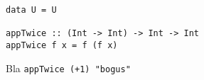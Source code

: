 \documentclass[12pt]{article}
\begin{document}
\maketitle
\abstract{}

\tableofcontents
\begin{verbatim}
data U = U

appTwice :: (Int -> Int) -> Int -> Int
appTwice f x = f (f x)
\end{verbatim}
Bla \texttt{appTwice (+1) "bogus"}

\newpage
{}






\newpage


\end{document}
